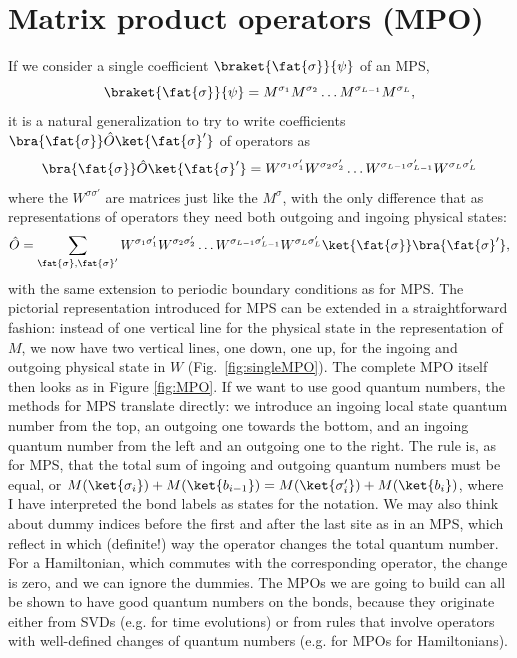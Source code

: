 \section{Matrix product operators (MPO)}
\label{sec:MPO}
If we consider a single coefficient $\braket{\fat{\sigma}}{\psi}$ of an MPS, 
\[
\braket{\fat{\sigma}}{\psi} = M^{\sigma_1}M^{\sigma_2}\ldots M^{\sigma_{L-1}}M^{\sigma_L},
\]
it is a natural generalization to try to write coefficients $\bra{\fat{\sigma}} \hat{O} \ket{\fat{\sigma}'}$ of operators as \cite{VerstraeteRipoll04,McCulloch07,VerstraetePirvu08,Crosswhite08,Frowis10}
\begin{equation}
\bra{\fat{\sigma}} \hat{O} \ket{\fat{\sigma}'} = W^{\sigma_1\sigma'_1}W^{\sigma_2\sigma'_2} \ldots
W^{\sigma_{L-1}\sigma'_{L-1}}W^{\sigma_L\sigma'_L}
\end{equation}
where the $W^{\sigma\sigma'}$ are matrices just like the $M^{\sigma}$, with the only difference that as representations of operators they need both outgoing and ingoing physical states:
\begin{equation}
\hat{O} = \sum_{\fat{\sigma},\fat{\sigma}'} W^{\sigma_1\sigma'_1}W^{\sigma_2\sigma'_2} \ldots
W^{\sigma_{L-1}\sigma'_{L-1}}W^{\sigma_L\sigma'_L} \ket{\fat{\sigma}}\bra{\fat{\sigma}'} ,
\label{eq:mpoform}
\end{equation}
with the same extension to periodic boundary conditions as for MPS. The pictorial representation introduced for MPS can be extended in a straightforward fashion: instead of one vertical line for the physical state in the representation of $M$, we now have two vertical lines, one down, one up, for the ingoing and outgoing physical state in $W$ (Fig.~\ref{fig:singleMPO}). The complete MPO itself then looks as in Figure \ref{fig:MPO}. If we want to use good quantum numbers, the methods for MPS translate directly: we introduce an ingoing local state quantum number from the top, an outgoing one towards the bottom, and an ingoing quantum number from the left and an outgoing one to the right. The rule is, as for MPS, that the total sum of ingoing and outgoing quantum numbers must be equal, or $M(\ket{\sigma_i}) + M(\ket{b_{i-1}}) = M(\ket{\sigma'_i}) + M(\ket{b_{i}})$, where I have interpreted the bond labels as states for the notation. We may also think about dummy indices before the first and after the last site as in an MPS, which reflect in which (definite!) way the operator changes the total quantum number. For a Hamiltonian, which commutes with the corresponding operator, the change is zero, and we can ignore the dummies. The MPOs we are going to build can all be shown to have good quantum numbers on the bonds, because they originate either from SVDs (e.g. for time evolutions) or from rules that involve operators with well-defined changes of quantum numbers (e.g. for MPOs for Hamiltonians).

